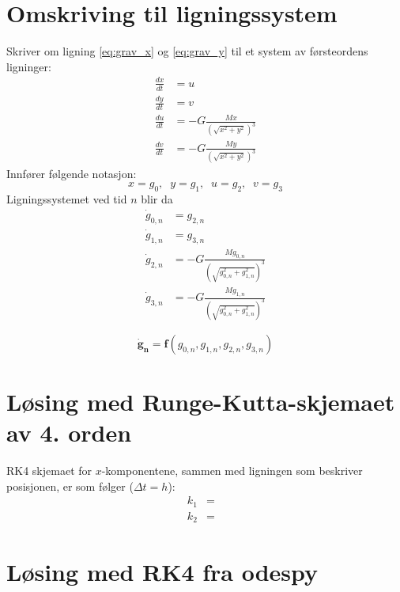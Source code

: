 \section{Omskriving til ligningssystem} %
\label{sec:omskriving_til_ligningssystem}
Skriver om ligning \eqref{eq:grav_x} og \eqref{eq:grav_y} til et system av førsteordens ligninger:
\begin{align*}
  \frac{dx}{dt} &= u  \\
  \frac{dy}{dt} &= v  \\
  \frac{du}{dt} &= -G \frac{Mx}{\left( \sqrt{x^2+y^2} \right)^3}  \\
  \frac{dv}{dt} &= -G \frac{My}{\left( \sqrt{x^2+y^2} \right)^3}
\end{align*}
Innfører følgende notasjon:
\begin{equation*}
  x = g_0, \;\; y = g_1, \;\; u = g_2, \;\; v = g_3
\end{equation*}
Ligningssystemet ved tid $n$ blir da
\begin{subequations}
\begin{align}
  \dot g_{0,n} &= g_{2,n}  \\
  \dot g_{1,n} &= g_{3,n}  \\
  \dot g_{2,n} &= -G \frac{Mg_{0,n}}{\left( \sqrt{g_{0,n}^2+g_{1,n}^2} \right)^3}  \\
  \dot g_{3,n} &= -G \frac{Mg_{1,n}}{\left( \sqrt{g_{0,n}^2+g_{1,n}^2} \right)^3}
\end{align}
\end{subequations}

\begin{equation}
  \mathbf{\dot g_n} = \mathbf{f}(g_{0,n}, g_{1,n}, g_{2,n}, g_{3,n})
\end{equation}




\section{Løsing med Runge-Kutta-skjemaet av 4. orden} %
\label{sec:l_sing_med_runge_kutta_skjemaet_av_4_orden}
RK4 skjemaet for $x$-komponentene, sammen med ligningen som beskriver posisjonen, er som følger ($\Delta t = h$):
\begin{subequations}
\begin{eqnarray}
  k_1 &= & \\
  k_2 &= &
\end{eqnarray}
\end{subequations}



\section{Løsing med RK4 fra odespy} %
\label{sec:l_sing_med_rk4_fra_odespy}



